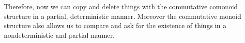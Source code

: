 \begin{definition}
\end{definition}
Therefore, now we can copy and delete things with the commutative comonoid structure in a partial, deterministic manner. Moreover the commutative monoid structure also allows us to  compare and ask for the existence of things in a nondeterministic and partial manner.


